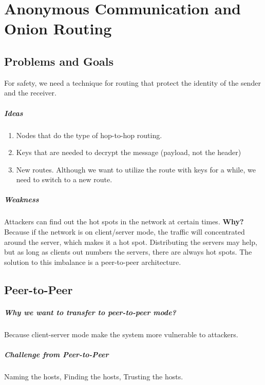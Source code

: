 \chapter{Anonymous Communication and Onion Routing}

\section{Problems and Goals}
For safety, we need a technique for routing that protect the identity of the sender and the receiver.

\paragraph{Ideas}
\begin{enumerate}
    \item Nodes that do the type of hop-to-hop routing.
    \item Keys that are needed to decrypt the message (payload, not the header)
    \item New routes. Although we want to utilize the route with keys for a while, we need to switch to a new route.
\end{enumerate}

\paragraph{Weakness}
Attackers can find out the hot spots in the network at certain times. \textbf{Why?} Because if the network is on client/server mode, the traffic will concentrated around the server, which makes it a hot spot. Distributing the servers may help, but as long as clients out numbers the servers, there are always hot spots. The solution to this imbalance is a peer-to-peer architecture. 

\section{Peer-to-Peer}
\paragraph{Why we want to transfer to peer-to-peer mode?}
Because client-server mode make the system more vulnerable to attackers.
\paragraph{Challenge from Peer-to-Peer}
Naming the hosts, Finding the hosts, Trusting the hosts.
